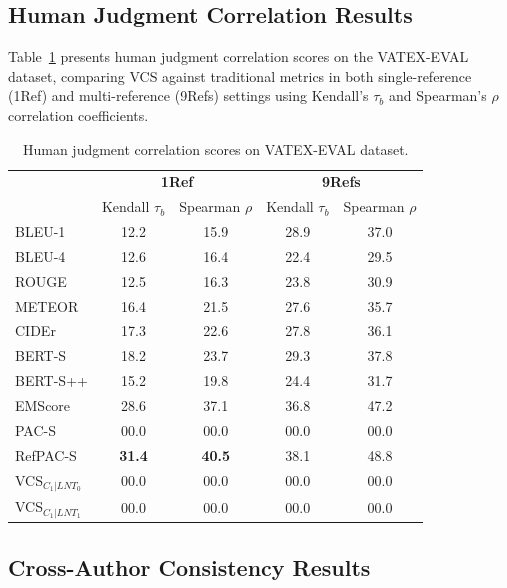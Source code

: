 \documentclass[letterpaper]{article} %
\begin{document}
\subsection{Human Judgment Correlation Results}

Table~\ref{tab:vatex-eval} presents human judgment correlation scores on the VATEX-EVAL dataset, comparing VCS against traditional metrics in both single-reference (1Ref) and multi-reference (9Refs) settings using Kendall's $\tau_b$ and Spearman's $\rho$ correlation coefficients.

\begin{table}[t]
  \centering
  \normalsize
  \setlength{\tabcolsep}{0.75mm}
  \begin{tabular}{l@{\hspace{0.1mm}}cccc}
    \hline
    & \multicolumn{2}{c}{\textbf{1Ref}} & \multicolumn{2}{c}{\textbf{9Refs}} \\
    \cline{2-3} \cline{4-5}
    & Kendall $\tau_b$ & Spearman $\rho$ & Kendall $\tau_b$ & Spearman $\rho$ \\
    \hline
    BLEU-1 & 12.2 & 15.9 & 28.9 & 37.0 \\
    BLEU-4 & 12.6 & 16.4 & 22.4 & 29.5 \\
    ROUGE & 12.5 & 16.3 & 23.8 & 30.9 \\
    METEOR & 16.4 & 21.5 & 27.6 & 35.7 \\
    CIDEr & 17.3 & 22.6 & 27.8 & 36.1 \\
    \hline
    BERT-S & 18.2 & 23.7 & 29.3 & 37.8 \\
    BERT-S++ & 15.2 & 19.8 & 24.4 & 31.7 \\
    \hline
    EMScore & 28.6 & 37.1 & 36.8 & 47.2 \\
    PAC-S & 00.0 & 00.0 & 00.0 & 00.0 \\
    RefPAC-S & \textbf{31.4} & \textbf{40.5} & 38.1 & 48.8 \\
    \hline
    VCS$_{C_1|LNT_0}$ & 00.0 & 00.0 & 00.0 & 00.0 \\
    VCS$_{C_1|LNT_1}$ & 00.0 & 00.0 & 00.0 & 00.0 \\
    \hline
  \end{tabular}
  \caption{Human judgment correlation scores on VATEX-EVAL dataset.}
  \label{tab:vatex-eval}
\end{table}

\subsection{Cross-Author Consistency Results}
\end{document}
